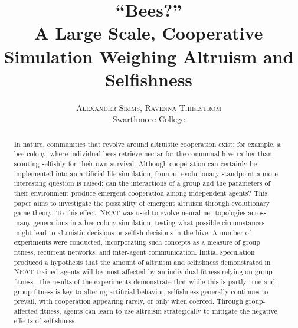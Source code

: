 \documentclass[twoside]{article}
\title{\vspace{-15mm}\fontsize{24pt}{10pt}\selectfont\textbf{``Bees?''\\\smallskip{} A Large Scale, Cooperative Simulation 
         Weighing Altruism and Selfishness}} %
\author{
\large
\textsc{Alexander Simms, Ravenna Thielstrom}\\[2mm] %
\normalsize Swarthmore College \\ %
\vspace{-5mm}
}
\date{}
\begin{document}
\maketitle %

\thispagestyle{fancy} %


\begin{abstract}

\noindent In nature, communities that revolve around altruistic cooperation exist: for example, a bee colony, where individual bees retrieve nectar for the communal hive rather than scouting selfishly for their own survival. Although cooperation can certainly be implemented into an artificial life simulation, from an evolutionary standpoint a more interesting question is raised: can the interactions of a group and the parameters of their environment produce emergent cooperation among independent agents? This paper aims to investigate the possibility of emergent altruism through evolutionary game theory. To this effect, NEAT was used to evolve neural-net topologies across many generations in a bee colony simulation, testing what possible circumstances might lead to altruistic decisions or selfish decisions in the hive. A number of experiments were conducted, incorporating such concepts as a measure of group fitness, recurrent networks, and inter-agent communication. Initial speculation produced a hypothesis that the amount of altruism and selfishness demonstrated in NEAT-trained agents will be most affected by an individual fitness relying on group fitness. The results of the experiments demonstrate that while this is partly true and group fitness is key to altering artificial behavior, selfishness generally continues to prevail, with cooperation appearing rarely, or only when coerced. Through group-affected fitness, agents can learn to use altruism strategically to mitigate the negative effects of selfishness.

\end{abstract}

\end{document}
